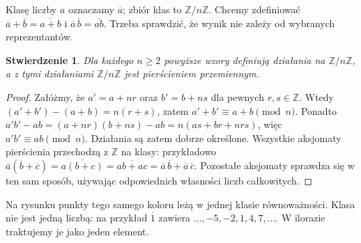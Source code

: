 \documentclass[11pt,a4paper,openany]{report}
\numberwithin{equation}{section}
\theoremstyle{plain}
\newtheorem{stwierdzenie}[twierdzenie]{Stwierdzenie}
\theoremstyle{definition}
\theoremstyle{remark}
\newcommand{\Z}{\mathbb Z}
\begin{document}
Klasę liczby $a$ oznaczamy $\overline a$; zbiór klas to $\Z/n\Z$.
Chcemy zdefiniować $\overline a+\overline b=\overline{a+b}$ i
$\overline a\,\overline b=\overline{ab}$. Trzeba sprawdzić,
że wynik nie zależy od wybranych reprezentantów.

\begin{stwierdzenie}
\label{st:modulo}
Dla każdego $n\ge2$ powyższe wzory definiują działania na $\Z/n\Z$,
a z tymi działaniami $\Z/n\Z$ jest pierścieniem przemiennym.
\end{stwierdzenie}
\begin{proof}
Załóżmy, że $a'=a+nr$ oraz $b'=b+ns$ dla pewnych $r,s\in\Z$.
Wtedy $(a'+b')-(a+b)=n(r+s)$, zatem $a'+b'\equiv a+b\pmod n$.
Ponadto
$a'b'-ab=(a+nr)(b+ns)-ab=n(as+br+nrs)$,
więc $a'b'\equiv ab\pmod n$. Działania są zatem dobrze określone.
Wszystkie aksjomaty pierścienia przechodzą z $\Z$ na klasy:
przykładowo $\overline a(\overline b+\overline c)
=\overline{a(b+c)}=\overline{ab+ac}
=\overline a\,\overline b+\overline a\,\overline c$.
Pozostałe aksjomaty sprawdza się w ten sam sposób, używając
odpowiednich własności liczb całkowitych.
\end{proof}

\begin{center}
\end{center}

Na rysunku punkty tego samego koloru leżą w jednej klasie równoważności.
Klasa nie jest jedną liczbą: na przykład $\overline1$ zawiera
$\dots,-5,-2,1,4,7,\dots$. W ilorazie traktujemy je jako jeden element.
\end{document}
